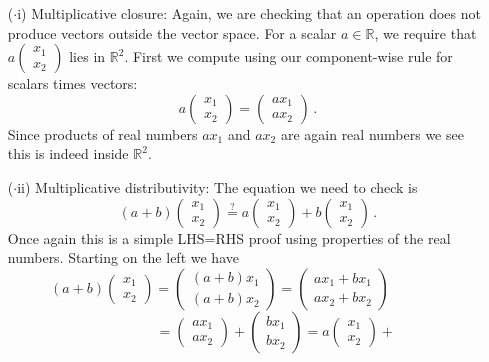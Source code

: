 {\begin{enumerate}
\item[($\cdot$i)] Multiplicative closure: Again, we are checking that 
an operation does not produce vectors outside the vector space. For a scalar $a\in{\mathbb R}$, we require that $a
\begin{pmatrix}x_1\\x_2\end{pmatrix}$ lies in ${\mathbb R}^2$.
First we compute using our component-wise rule for scalars times vectors:
\[
a
\begin{pmatrix}x_1\\x_2\end{pmatrix}=
\begin{pmatrix}ax_1\\ax_2\end{pmatrix}\, .
\]
Since products of real numbers $a x_1$ and $a x_2$ are again real numbers we see this is indeed inside ${\mathbb R}^2$.
\item[($\cdot$ii)] Multiplicative distributivity: The equation we need to check is
\[
(a+b)
\begin{pmatrix}x_1\\x_2\end{pmatrix}\stackrel?=
a\begin{pmatrix}x_1\\x_2\end{pmatrix}+
b\begin{pmatrix}x_1\\x_2\end{pmatrix}
\, .
\] 
Once again this is a simple LHS=RHS proof using properties of the real numbers. Starting on the left we have
\[
(a+b)
\begin{pmatrix}x_1\\x_2\end{pmatrix}
=
\begin{pmatrix}(a+b)x_1\\(a+b)x_2\end{pmatrix}
=
\begin{pmatrix}ax_1+b x_1\\ax_2+bx_2\end{pmatrix}
\qquad\qquad\] \[\qquad\qquad=
\begin{pmatrix}ax_1\\ax_2\end{pmatrix}+
\begin{pmatrix}b x_1\\bx_2\end{pmatrix}
=
a\begin{pmatrix}x_1\\x_2\end{pmatrix}+
\]
\end{enumerate}}

